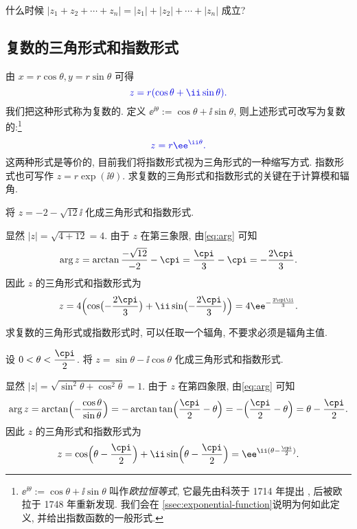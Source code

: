 \begin{exercise}
  什么时候 $|z_1+z_2+\cdots+z_n|=|z_1|+|z_2|+\cdots+|z_n|$ 成立?
\end{exercise}


\subsection{复数的三角形式和指数形式}

由 $x=r\cos\theta,y=r\sin\theta$ 可得
\[
  \color{main}z=r(\cos\theta+\ii\sin\theta).
\]
我们把这种形式称为复数的.
定义 \alert{$\ee^{\ii\theta}:=\cos\theta+\ii\sin\theta$}, 则上述形式可改写为复数的:\footnote{%
  $\ee^{\ii\theta}:=\cos\theta+\ii\sin\theta$ 叫作\emph{欧拉恒等式}, 它最先由科茨于 1714 年提出 \cite[第19章3节]{Kline1990b}, 后被欧拉于 1748 年重新发现.
  我们会在 \ref{ssec:exponential-function}说明为何如此定义, 并给出指数函数的一般形式.
}
\[
  \color{main}z=r\ee^{\ii\theta}.
\]
这两种形式是等价的, 目前我们将指数形式视为三角形式的一种缩写方式.
指数形式也可写作 $z=r\exp(\ii\theta)$.
求复数的三角形式和指数形式的\alert{关键在于计算模和辐角}.

\begin{example}
  将 $z=-2-\sqrt{12}\ii$ 化成三角形式和指数形式.
\end{example}

\begin{solution}
  显然 $|z|=\sqrt{4+12}=4$.
  由于 $z$ 在第三象限, 由\eqref{eq:arg} 可知
  \[
     \arg z
    =\arctan\frac{-\sqrt{12}}{-2}-\cpi
    =\frac\cpi3-\cpi
    =-\frac{2\cpi}3.
  \]
  因此 $z$ 的三角形式和指数形式为
  \[
     z
    =4\Bigl(\cos\bigl(-\frac{2\cpi}3\bigr)+\ii\sin\bigl(-\frac{2\cpi}3\bigr)\Bigr)
    =4\ee^{-\frac{2\cpi \ii}3}.
  \]
\end{solution}

求复数的三角形式或指数形式时, 可以任取一个辐角, 不要求必须是辐角主值.

\begin{example}
  设 $0<\theta<\dfrac\cpi2$.
  将 $z=\sin\theta-\ii\cos\theta$ 化成三角形式和指数形式.
\end{example}

\begin{solution}[解法一]
  显然 $|z|=\sqrt{\sin^2\theta+\cos^2\theta}=1$. 由于 $z$ 在第四象限, 由\eqref{eq:arg} 可知
  \[
     \arg z
    =\arctan\Bigl(-\frac{\cos\theta}{\sin\theta}\Bigr)
    =-\arctan\tan\Bigl(\frac\cpi2-\theta\Bigr)
    =-\Bigl(\frac\cpi2-\theta\Bigr)
    =\theta-\frac\cpi2.
  \]
  因此 $z$ 的三角形式和指数形式为
  \[
     z
    =\cos\Bigl(\theta-\frac\cpi2\Bigr)+\ii\sin\Bigl(\theta-\frac\cpi2\Bigr)
    =\ee^{\ii(\theta-\frac\cpi2)}.
  \]
\end{solution}

